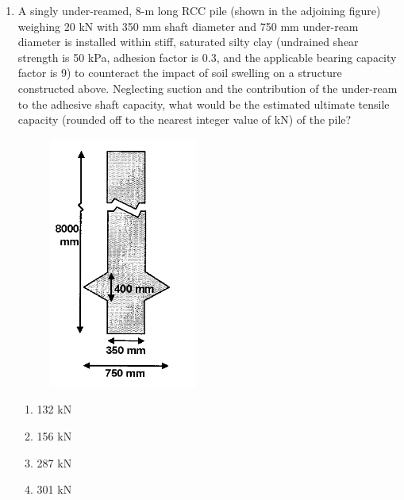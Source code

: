 \documentclass[journal,12pt,onecolumn]{IEEEtran}
\theoremstyle{remark}
\begin{document}
\begin{enumerate}
\item A singly under-reamed, 8-m long RCC pile (shown in the adjoining figure) weighing 20 kN with 350 mm shaft diameter and 750 mm under-ream diameter is installed within stiff, saturated silty clay (undrained shear strength is 50 kPa, adhesion factor is 0.3, and the applicable bearing capacity factor is 9) to counteract the impact of soil swelling on a structure constructed above. Neglecting suction and the contribution of the under-ream to the adhesive shaft capacity, what would be the estimated ultimate tensile capacity (rounded off to the nearest integer value of kN) of the pile?
\begin{figure}[ht]
\centering
\includegraphics[scale=0.4]{figs/fig5.png}
\end{figure}
	\begin{multicols}{4}
	\begin{enumerate}
		\item 132 kN
		\item 156 kN
		\item 287 kN
		\item 301 kN
	\end{enumerate}
	\end{multicols}


\end{enumerate}
\end{document}
